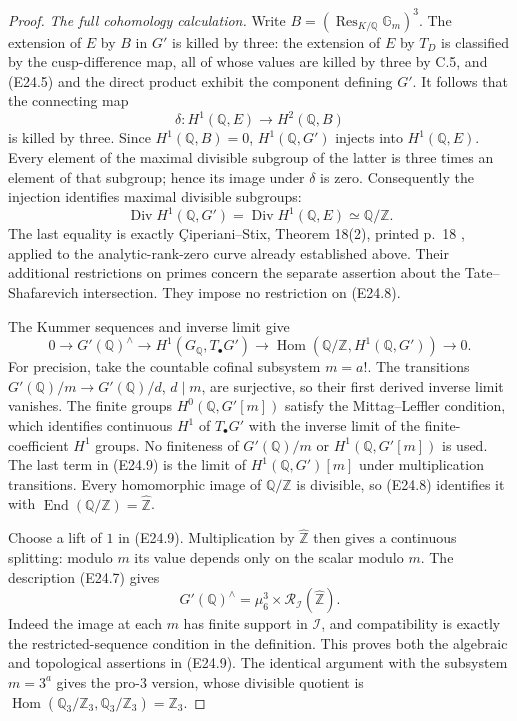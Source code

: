 \begin{proof}
\emph{The full cohomology calculation.}
Write $B=(\operatorname{Res}_{K/\mathbb Q}\mathbb G_m)^3$.
The extension of $E$ by $B$ in $G'$ is killed by three: the
extension of $E$ by $T_D$ is classified by the cusp-difference
map, all of whose values are killed by three by C.5, and (E24.5)
and the direct product exhibit the component defining $G'$.
It follows that the connecting map
\[
 \delta:H^1(\mathbb Q,E)\longrightarrow H^2(\mathbb Q,B)
\]
is killed by three. Since $H^1(\mathbb Q,B)=0$,
$H^1(\mathbb Q,G')$ injects into $H^1(\mathbb Q,E)$.
Every element of the maximal divisible subgroup of the latter
is three times an element of that subgroup; hence its image under
$\delta$ is zero. Consequently the injection identifies maximal
divisible subgroups:
\[
 \operatorname{Div}H^1(\mathbb Q,G')
   =\operatorname{Div}H^1(\mathbb Q,E)\simeq\mathbb Q/\mathbb Z .
 \tag{E24.8}
\]
The last equality is exactly
\c{C}iperiani--Stix, Theorem 18(2), printed p.~18
\cite{EC_CiperianiStix}, applied to the analytic-rank-zero curve
already established above. Their additional restrictions on primes
concern the separate assertion about the Tate--Shafarevich
intersection. They impose no restriction on (E24.8).

The Kummer sequences and inverse limit give
\[
 0\longrightarrow G'(\mathbb Q)^\wedge
 \longrightarrow H^1(G_{\mathbb Q},T_\bullet G')
 \longrightarrow
 \operatorname{Hom}(\mathbb Q/\mathbb Z,H^1(\mathbb Q,G'))
 \longrightarrow0 .
 \tag{E24.9}
\]
For precision, take the countable cofinal subsystem $m=a!$.
The transitions $G'(\mathbb Q)/m\to G'(\mathbb Q)/d$, $d\mid m$,
are surjective, so their first derived inverse limit vanishes.
The finite groups $H^0(\mathbb Q,G'[m])$ satisfy the
Mittag--Leffler condition, which identifies continuous $H^1$ of
$T_\bullet G'$ with the inverse limit of the finite-coefficient
$H^1$ groups. No finiteness of
$G'(\mathbb Q)/m$ or $H^1(\mathbb Q,G'[m])$ is used.
The last term in (E24.9) is the limit of
$H^1(\mathbb Q,G')[m]$ under multiplication transitions.
Every homomorphic image of $\mathbb Q/\mathbb Z$ is divisible,
so (E24.8) identifies it with
$\operatorname{End}(\mathbb Q/\mathbb Z)=\widehat{\mathbb Z}$.

Choose a lift of $1$ in (E24.9). Multiplication by
$\widehat{\mathbb Z}$ then gives a continuous splitting: modulo
$m$ its value depends only on the scalar modulo $m$.
The description (E24.7) gives
\[
 G'(\mathbb Q)^\wedge
  =\mu_6^3\times\mathcal R_{\mathcal I}(\widehat{\mathbb Z}).
 \tag{E24.10}
\]
Indeed the image at each $m$ has finite support in $\mathcal I$,
and compatibility is exactly the restricted-sequence condition
in the definition. This proves both the algebraic and
topological assertions in (E24.9).
The identical argument with the subsystem $m=3^a$ gives the
pro-$3$ version, whose divisible quotient is
$\operatorname{Hom}(\mathbb Q_3/\mathbb Z_3,
 \mathbb Q_3/\mathbb Z_3)=\mathbb Z_3$.


\end{proof}
